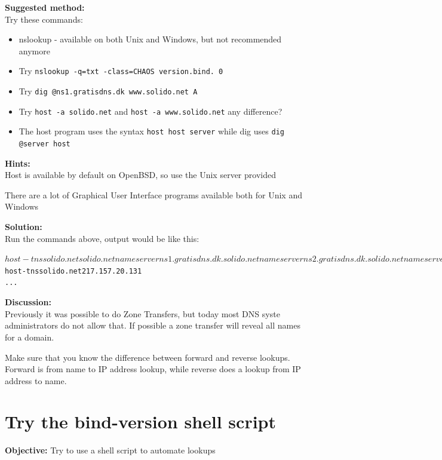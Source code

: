 \documentclass[a4paper,11pt,notitlepage]{report}
\begin{document}
{\bf Suggested method:}\\

Try these commands:
\begin{itemize}
\item nslookup - available on both Unix and Windows, but not recommended anymore
\item Try \verb+nslookup -q=txt -class=CHAOS version.bind. 0+
\item Try \verb+dig @ns1.gratisdns.dk www.solido.net A+
\item Try \verb+host -a solido.net+ and
\verb+host -a www.solido.net+ any difference?
\\
\item The host program uses the syntax \verb+host host server+ while dig uses \verb+dig @server host+
\end{itemize}

{\bf Hints:}\\
Host is available by default on OpenBSD, so use the Unix server provided

There are a lot of Graphical User Interface programs available both for Unix and Windows

{\bf Solution:}\\
Run the commands above, output would be like this:

\begin{alltt}
$ host -t ns solido.net
solido.net name server ns1.gratisdns.dk.
solido.net name server ns2.gratisdns.dk.
solido.net name server ns3.gratisdns.dk.
solido.net name server ns4.gratisdns.dk.
solido.net name server ns5.gratisdns.dk.
$ host -t ns solido.net 217.157.20.131
...
\end{alltt}


{\bf Discussion:}\\
Previously it was possible to do Zone Transfers, but today most DNS syste administrators do not allow that. If possible a zone transfer will reveal all names for a domain.

Make sure that you know the difference between forward and reverse lookups. Forward is from name to IP address lookup, while reverse does a lookup from IP address to name.


\chapter{Try the bind-version shell script}
\label{ex:bind-version-script}

{\bf Objective:}
Try to use a shell script to automate lookups
\end{document}

